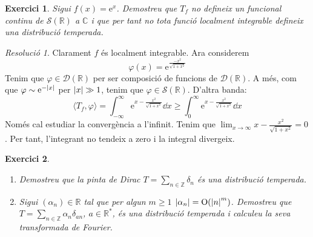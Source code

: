 \documentclass[10pt,a4paper]{article}
\newcommand{\ZZ}{\ensuremath{\mathbb{Z}}} %
\newcommand{\RR}{\ensuremath{\mathbb{R}}} %
\newcommand{\CC}{\ensuremath{\mathbb{C}}} %
\renewcommand{\O}{\mathrm{O}} %
\newtheorem{exercici}{Exercici}
\theoremstyle{definition}
\theoremstyle{remark}
\newtheorem*{res}{Resolució}
\renewcommand{\exp}[1]{\mathrm{e}^{#1}} %
\begin{document}
\begin{exercici}
  Sigui $f(x)=\exp{x}$. Demostreu que $T_f$ no defineix un funcional continu de $\mathcal{S}(\RR)$ a $\CC$ i que per tant no tota funció localment integrable defineix una distribució temperada.
\end{exercici}
\begin{res}
  Clarament $f$ és localment integrable. Ara considerem
  $$
    \varphi(x)=\exp{\frac{-x^2}{\sqrt{1+x^2}}}
  $$
  Tenim que $\varphi\in\mathcal{D}(\RR)$ per ser composició de funcions de $\mathcal{D}(\RR)$. A més, com que $\varphi\sim \exp{-\abs{x}}$ per $\abs{x}\gg1$, tenim que $\varphi\in\mathcal{S}(\RR)$. D'altra banda:
  $$
    \langle T_f, \varphi\rangle=\int_{-\infty}^\infty\exp{x-\frac{x^2}{\sqrt{1+x^2}}}\dd{x}\geq \int_{0}^\infty\exp{x-\frac{x^2}{\sqrt{1+x^2}}}\dd{x}
  $$
  Només cal estudiar la convergència a l'infinit. Tenim que $\displaystyle\lim_{x\to\infty} x-\frac{x^2}{\sqrt{1+x^2}}=0$. Per tant, l'integrant no tendeix a zero i la integral divergeix.
\end{res}
\begin{exercici}\hfill
  \begin{enumerate}
    \item Demostreu que la pinta de Dirac $T=\sum_{n\in\ZZ}\delta_n$ és una distribució temperada.
    \item Sigui $(\alpha_n)\in\RR$ tal que per algun $m\geq1$ $\abs{\alpha_n}=\O({\abs{n}^{m}})$. Demostreu que $T=\sum_{n\in\ZZ}\alpha_n\delta_{an}$, $a\in\RR^*$, és una distribució temperada i calculeu la seva transformada de Fourier.
  \end{enumerate}
\end{exercici}
\end{document}
